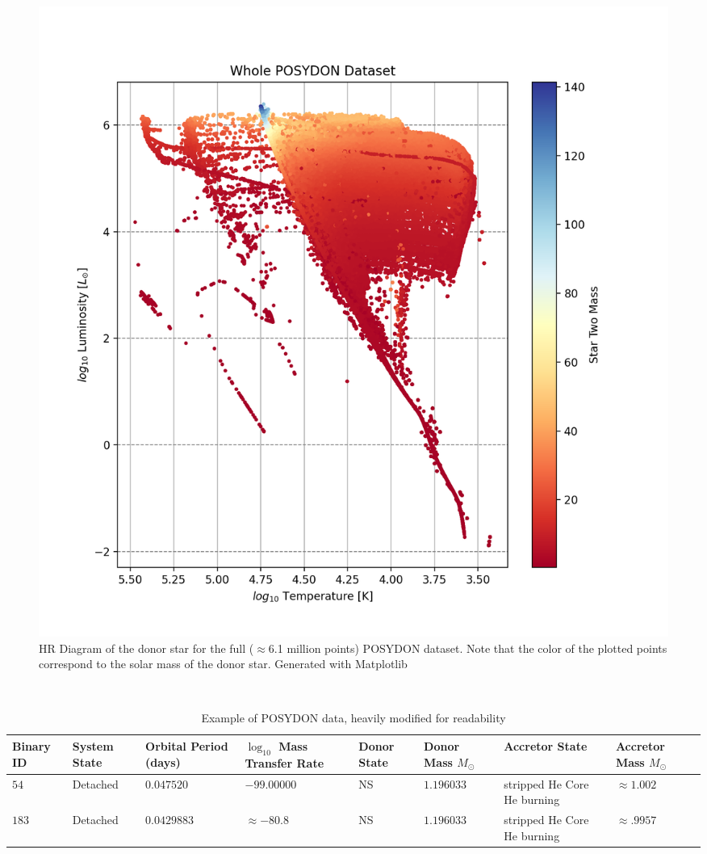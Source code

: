 \documentclass[12pt, a4paper]{article}
\begin{document}
    \begin{figure} [H]
        \centering
        \includegraphics[width = \textwidth]{figs/WholePOSYDONDatasetExample.png}
        \caption{HR Diagram of the donor star for the full ($\approx$6.1 million points) POSYDON dataset. Note that the color of the plotted points correspond to the solar mass of the donor star. Generated with Matplotlib}
        \label{EntireDataSetHR}
    \end{figure}

    \begin{table}[H]
        \centering\
        \footnotesize
        \begin{tabularx}{\textwidth}{||X | X | X | X | X | X | X | X ||}
            \hline 
            \textbf{Binary ID} & 
            \textbf{System State} & 
            \textbf{Orbital Period (days)} & 
            \boldmath$\log_{10}$ \textbf{Mass Transfer Rate} & 
            \textbf{Donor State} & 
            \textbf{Donor Mass} $M_\odot$ & 
            \textbf{Accretor State} & 
            \textbf{Accretor Mass} $M_\odot$
            \\ \hline \hline
            $54$ & Detached & $0.047520$ & $-99.00000$ & NS & $1.196033$ & stripped He Core He burning & $\approx 1.002$ \\
            \hline
            $183$ & Detached & $0.0429883$ & $ \approx -80.8$ & NS & $1.196033$ & stripped He Core He burning & $\approx .9957$ \\
            \hline
        \end{tabularx}
        \caption{Example of POSYDON data, heavily modified for readability}
        \label{POSYDONDataExample}
    \end{table}
\end{document}
